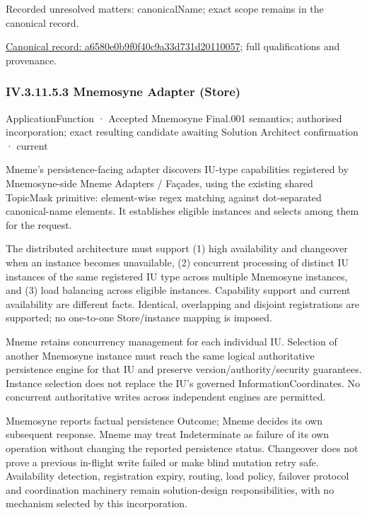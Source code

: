 {\small Recorded unresolved matters: canonicalName; exact scope remains in the canonical record.}\par
{\footnotesize \href{../../../../continuum/application/application-function/a6580e0b9f0f40c9a33d731d20110057.md}{Canonical record: a6580e0b9f0f40c9a33d731d20110057}; full qualifications and provenance.}\par
\subsubsection*{IV.3.11.5.3 Mnemosyne Adapter (Store)}
\label{navigation:IV.3.11.5.3}

\label{element:9c680d56a6b943da8ff22f3264e19bc7}
{\small ApplicationFunction · Accepted Mnemosyne Final.001 semantics; authorised incorporation; exact resulting candidate awaiting Solution Architect confirmation · current}\par

Mneme's persistence-facing adapter discovers IU-type capabilities registered by Mnemosyne-side Mneme Adapters / Façades, using the existing shared TopicMask primitive: element-wise regex matching against dot-separated canonical-name elements. It establishes eligible instances and selects among them for the request.



The distributed architecture must support (1) high availability and changeover when an instance becomes unavailable, (2) concurrent processing of distinct IU instances of the same registered IU type across multiple Mnemosyne instances, and (3) load balancing across eligible instances. Capability support and current availability are different facts. Identical, overlapping and disjoint registrations are supported; no one-to-one Store/instance mapping is imposed.



Mneme retains concurrency management for each individual IU. Selection of another Mnemosyne instance must reach the same logical authoritative persistence engine for that IU and preserve version/authority/security guarantees. Instance selection does not replace the IU's governed InformationCoordinates. No concurrent authoritative writes across independent engines are permitted.



Mnemosyne reports factual persistence Outcome; Mneme decides its own subsequent response. Mneme may treat Indeterminate as failure of its own operation without changing the reported persistence status. Changeover does not prove a previous in-flight write failed or make blind mutation retry safe. Availability detection, registration expiry, routing, load policy, failover protocol and coordination machinery remain solution-design responsibilities, with no mechanism selected by this incorporation.



